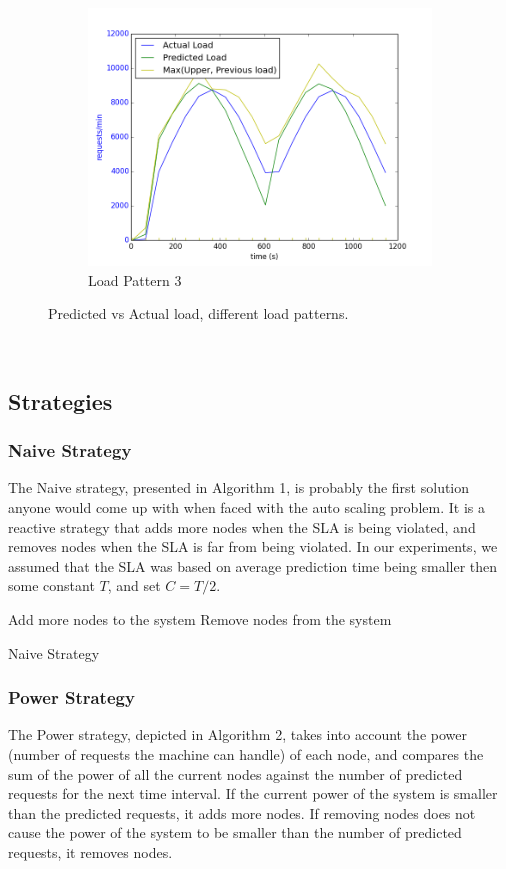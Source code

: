 \documentclass[12pt]{article}
\begin{document}
\begin{figure}[h!]
\begin{subfigure}{.6\textwidth}
\includegraphics[width=\textwidth]{Smart382predictedVsActual.png}
\caption{Load Pattern 3}
\end{subfigure}
\caption{Predicted vs Actual load, different load patterns.}
\label{loadsss}
\end{figure}
\newpage

~
\newpage
\subsection{Strategies}
\subsubsection{Naive Strategy}
The Naive strategy, presented in Algorithm 1, is probably the first solution
anyone would come up with when faced with the auto scaling problem. It is a
reactive strategy that adds more nodes when the SLA is being violated, and
removes nodes when the SLA is far from being violated. In our experiments, we
assumed that the SLA was based on average prediction time being smaller then
some constant $T$, and set $C = T / 2$.

\begin{algorithm}[H]
 {
Add more nodes to the system
}
 {
Remove nodes from the system
}
\caption{Naive Strategy}
\end{algorithm}

\subsubsection{Power Strategy}
The Power strategy, depicted in Algorithm 2, takes into account the power (number of requests the machine
can handle) of each node, and compares the sum of the power of all the current
nodes against the number of predicted requests for the next time interval. If
the current power of the system is smaller than the predicted requests, it adds
more nodes. If removing nodes does not cause the power of the system to be
smaller than the number of predicted requests, it removes nodes.
\end{document}
